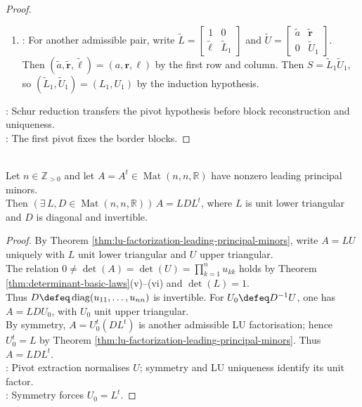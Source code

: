 \begin{theorem}
\begin{proof}
\begin{enumerate}[label=(\roman*)]
\item {}: For another admissible pair, write $\widetilde L=\left[\begin{smallmatrix}1&0\\\widetilde{\boldsymbol\ell}&\widetilde L_1\end{smallmatrix}\right]$ and $\widetilde U=\left[\begin{smallmatrix}\widetilde a&\widetilde{\mathbf r}\\0&\widetilde U_1\end{smallmatrix}\right]$.\\
Then $(\widetilde a,\widetilde{\mathbf r},\widetilde{\boldsymbol\ell})=(a,\mathbf r,\boldsymbol\ell)$ by the first row and column. Then $S=\widetilde L_1\widetilde U_1$, so $(\widetilde L_1,\widetilde U_1)=(L_1,U_1)$ by the induction hypothesis.
\end{enumerate}
: Schur reduction transfers the pivot hypothesis before block reconstruction and uniqueness.\\
: The first pivot fixes the border blocks.
\end{proof}
\end{theorem}

\begin{corollary} \label{cor:symmetric-lu-gives-ldlt} \\
Let $n\in\mathbb{Z}_{>0}$ and let $A=A^t\in\operatorname{Mat}(n,n,\mathbb{R})$ have nonzero leading principal minors.\\
Then $(\exists\,L,D\in\operatorname{Mat}(n,n,\mathbb{R}))\,A=LDL^t$, where $L$ is unit lower triangular and $D$ is diagonal and invertible.
\begin{proof}
By Theorem \ref{thm:lu-factorization-leading-principal-minors}, write $A=LU$ uniquely with $L$ unit lower triangular and $U$ upper triangular.\\
The relation $0\neq\det(A)=\det(U)=\prod\limits_{k=1}^{n}u_{kk}$ holds by Theorem \ref{thm:determinant-basic-laws}(v)--(vi) and $\det(L)=1$.\\
Thus $D\defeq\operatorname{diag}(u_{11},\ldots,u_{nn})$ is invertible. For $U_0\defeq D^{-1}U$, one has $A=LDU_0$, with $U_0$ unit upper triangular.\\
By symmetry, $A=U_0^t(DL^t)$ is another admissible LU factorisation; hence $U_0^t=L$ by Theorem \ref{thm:lu-factorization-leading-principal-minors}. Thus $A=LDL^t$.\\
: Pivot extraction normalises $U$; symmetry and LU uniqueness identify its unit factor.\\
: Symmetry forces $U_0=L^t$.
\end{proof}
\end{corollary}


